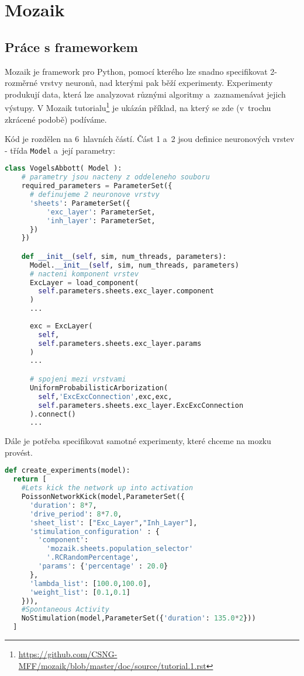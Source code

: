 \chapter{Mozaik}
\label{chap:refs}
\section{Práce s frameworkem}

Mozaik je framework pro Python, pomocí kterého lze snadno specifikovat 2-rozměrné vrstvy neuronů, nad kterými pak běží experimenty. Experimenty produkují data, která lze analyzovat různými algoritmy a~zaznamenávat jejich výstupy. V Mozaik tutorialu\footnote{\url{https://github.com/CSNG-MFF/mozaik/blob/master/doc/source/tutorial.1.rst}} je ukázán příklad, na který se zde (v~trochu zkrácené podobě) podíváme.

Kód je rozdělen na 6~hlavních částí. Část 1 a~2 jsou definice neuronových vrstev - třída \lstinline|Model| a~její parametry:

\begin{lstlisting}[language=Python]
  class VogelsAbbott( Model ):
    # parametry jsou nacteny z oddeleneho souboru
    required_parameters = ParameterSet({
      # definujeme 2 neuronove vrstvy
      'sheets': ParameterSet({
          'exc_layer': ParameterSet,
          'inh_layer': ParameterSet, 
      })
    })

    def __init__(self, sim, num_threads, parameters):
      Model.__init__(self, sim, num_threads, parameters)
      # nacteni komponent vrstev
      ExcLayer = load_component(
        self.parameters.sheets.exc_layer.component
      )
      ...
      
      exc = ExcLayer(
        self, 
        self.parameters.sheets.exc_layer.params
      )
      ...

      # spojeni mezi vrstvami
      UniformProbabilisticArborization(
        self,'ExcExcConnection',exc,exc,
        self.parameters.sheets.exc_layer.ExcExcConnection
      ).connect()
      ...
\end{lstlisting}

Dále je potřeba specifikovat samotné experimenty, které chceme na mozku provést.

\begin{lstlisting}[language=Python]
def create_experiments(model):
  return [
    #Lets kick the network up into activation
    PoissonNetworkKick(model,ParameterSet({
      'duration': 8*7,
      'drive_period': 8*7.0,
      'sheet_list': ["Exc_Layer","Inh_Layer"],
      'stimulation_configuration' : {
        'component':
          'mozaik.sheets.population_selector'
          '.RCRandomPercentage',
        'params': {'percentage' : 20.0}
      },
      'lambda_list': [100.0,100.0],
      'weight_list': [0.1,0.1]
    })),
    #Spontaneous Activity 
    NoStimulation(model,ParameterSet({'duration': 135.0*2}))
  ]
\end{lstlisting}

